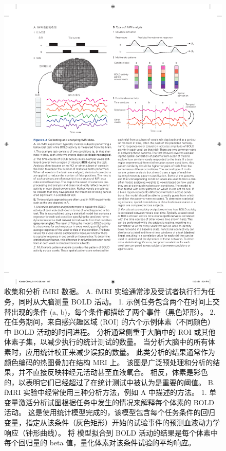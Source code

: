 \begin{figure}[htbp]
	\centering
	\includegraphics[width=1.0\linewidth]{chap06/fig_6_2}
	\caption{收集和分析 fMRI 数据。 
		A. fMRI 实验通常涉及受试者执行行为任务，同时从大脑测量 BOLD 活动。 
		1. 示例任务包含两个在时间上交替出现的条件 (a, b)，每个条件都描绘了两个事件（黑色矩形）。 
		2. 在任务期间，来自感兴趣区域 (ROI) 的六个示例体素（不同颜色）中 BOLD 活动的时间进程。 
		分析通常侧重于大脑中的 ROI 或其他体素子集，以减少执行的统计测试的数量。 
		当分析大脑中的所有体素时，应用统计校正来减少误报的数量。 
		此类分析的结果通常作为颜色编码的热图叠加在结构 MRI 上。 
		该图是广泛预处理和分析的结果，并不直接反映神经元活动甚至血液氧合。 
		相反，体素是彩色的，以表明它们已经超过了在统计测试中被认为是重要的阈值。 
		B. fMRI 实验中经常使用三种分析方法，例如 A 中描述的方法。
		1. 单变量激活分析试图根据任务中发生的情况来解释每个体素的 BOLD 活动。 
		这是使用统计模型完成的，该模型包含每个任务条件的回归变量，指定从该条件（灰色矩形）开始的试验事件的预测血液动力学响应（钟形曲线）。 将
		模型拟合到 BOLD 活动的结果是每个体素中每个回归量的 beta 值，量化体素对该条件试验的平均响应。 
}
\end{figure}

